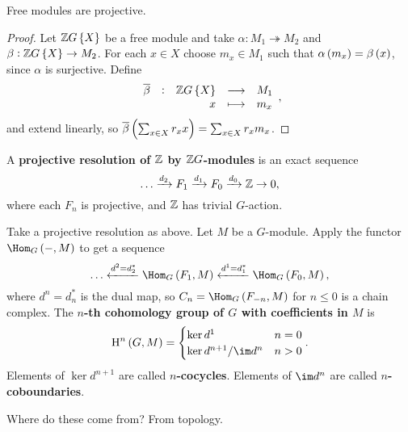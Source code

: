 \begin{proposition}
Free modules are projective.
\end{proposition}

\begin{proof}
Let $ \ZZ G\cbr{X} $ be a free module and take $ \alpha : M_1 \twoheadrightarrow M_2 $ and $ \beta : \ZZ G\cbr{X} \to M_2 $. For each $ x \in X $ choose $ m_x \in M_1 $ such that $ \alpha\br{m_x} = \beta\br{x} $, since $ \alpha $ is surjective. Define
$$ \function[\overline{\beta}]{\ZZ G\cbr{X}}{M_1}{x}{m_x}, $$
and extend linearly, so $ \overline{\beta}\br{\sum_{x \in X} r_xx} = \sum_{x \in X} r_xm_x $.
\end{proof}

\pagebreak

\begin{definition}
A \textbf{projective resolution of $ \mathbb{Z} $ by $ \mathbb{Z} G $-modules} is an exact sequence
$$ \dots \xrightarrow{d_2} F_1 \xrightarrow{d_1} F_0 \xrightarrow{d_0} \mathbb{Z} \to 0, $$
where each $ F_n $ is projective, and $ \mathbb{Z} $ has trivial $ G $-action.
\end{definition}

\begin{definition}
Take a projective resolution as above. Let $ M $ be a $ G $-module. Apply the functor $ \Hom_G\br{-, M} $ to get a sequence
$$ \dots \xleftarrow{d^2 = d_2^*} \Hom_G\br{F_1, M} \xleftarrow{d^1 = d_1^*} \Hom_G\br{F_0, M}, $$
where $ d^n = d_n^* $ is the dual map, so $ C_n = \Hom_G\br{F_{-n}, M} $ for $ n \le 0 $ is a chain complex. The \textbf{$ n $-th cohomology group of $ G $ with coefficients in $ M $} is
$$ \H^n\br{G, M} =
\begin{cases}
\ker d^1 & n = 0 \\
\ker d^{n + 1} / \im d^n & n > 0
\end{cases}.
$$
Elements of $ \ker d^{n + 1} $ are called \textbf{$ n $-cocycles}. Elements of $ \im d^n $ are called \textbf{$ n $-coboundaries}.
\end{definition}

Where do these come from? From topology.


